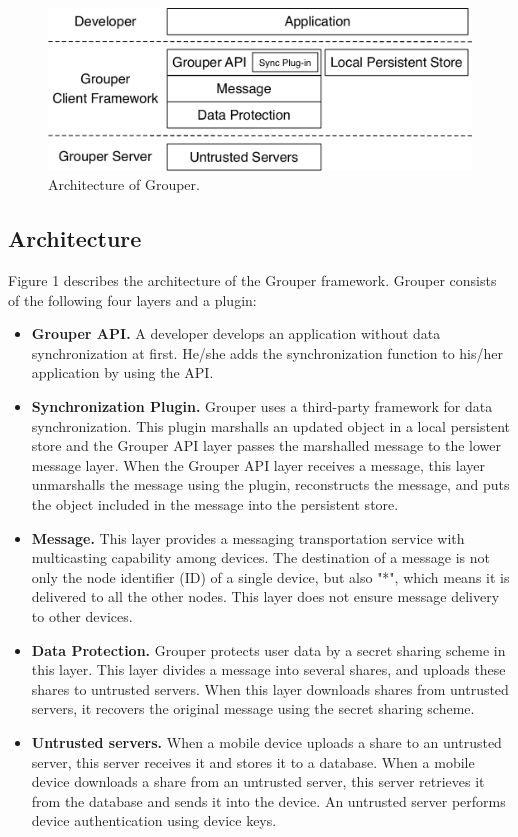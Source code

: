 \documentclass{sig-alternate-05-2015}
\begin{document}
\begin{figure}[t]
	\centering
	\includegraphics[scale=0.47]{architecture}
	\caption{Architecture of Grouper.}
\end{figure}

\subsection{Architecture}

Figure 1 describes the architecture of the Grouper framework. 
Grouper consists of the following four layers and a plugin:

\begin{itemize}[leftmargin=7mm]
	\setlength{\itemsep}{1pt}
	\setlength{\parskip}{0pt}
	\setlength{\parsep}{0pt}
	\item \textbf{Grouper API.}
	A developer develops an application without data synchronization at first. 
	He/she adds the synchronization function to his/her application by using the API.
	\item \textbf{Synchronization Plugin.} 
	Grouper uses a third-party framework for data synchronization.
	This plugin marshalls an updated object in a local persistent store and the Grouper API layer passes the marshalled message to the lower message layer.
	When the Grouper API layer receives a message, this layer unmarshalls the message using the plugin, reconstructs the message, and puts the object included in the message into the persistent store.
	\item \textbf{Message.}
	This layer provides a messaging transportation service with multicasting capability among devices.
	The destination of a message is not only the node identifier (ID) of a single device, but also "*", which means it is delivered to all the other nodes.
	This layer does not ensure message delivery to other devices.
	\item \textbf{Data Protection.}
	Grouper protects user data by a secret sharing scheme in this layer.
	This layer divides a message into several shares, and uploads these shares to untrusted servers.
	When this layer downloads shares from untrusted servers, it recovers the original message using the secret sharing scheme.
	\item \textbf{Untrusted servers.}
	When a mobile device uploads a share to an untrusted server, this server receives it and stores it to a database.
	When a mobile device downloads a share from an untrusted server, this server retrieves it from the database and sends it into the device.
	An untrusted server performs device authentication using device keys.
\end{itemize}
\end{document}

